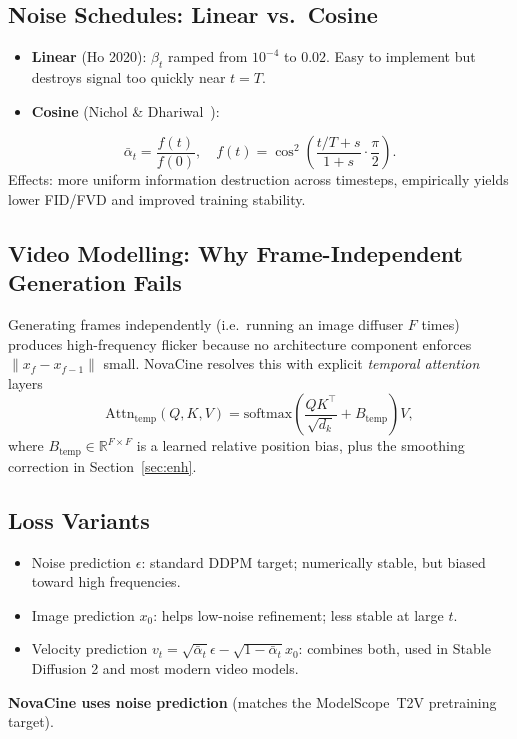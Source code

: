 \documentclass[conference]{IEEEtran}
\begin{document}
\subsection{Noise Schedules: Linear vs.\ Cosine}
\begin{itemize}
  \item \textbf{Linear} (Ho 2020): $\beta_t$ ramped from $10^{-4}$ to $0.02$.
        Easy to implement but destroys signal too quickly near $t=T$.
  \item \textbf{Cosine} (Nichol \& Dhariwal~\cite{improved_ddpm2021}):
\end{itemize}
\begin{equation}
\bar{\alpha}_t = \frac{f(t)}{f(0)},\quad
f(t) = \cos^2\!\left(\frac{t/T + s}{1+s}\cdot\frac{\pi}{2}\right).
\end{equation}
Effects: more uniform information destruction across timesteps,
empirically yields lower FID/FVD and improved training stability.

\subsection{Video Modelling: Why Frame-Independent Generation Fails}
Generating frames independently (i.e.\ running an image diffuser
$F$ times) produces high-frequency flicker because no architecture
component enforces $\|x_f - x_{f-1}\|$ small. NovaCine resolves
this with explicit \emph{temporal attention} layers
\begin{equation}
\mathrm{Attn}_{\text{temp}}(Q,K,V) = \mathrm{softmax}\!\left(\frac{QK^\top}{\sqrt{d_k}} + B_{\text{temp}}\right)V,
\end{equation}
where $B_{\text{temp}}\in\mathbb{R}^{F\times F}$ is a learned
relative position bias, plus the smoothing correction in
Section~\ref{sec:enh}.

\subsection{Loss Variants}
\begin{itemize}
  \item Noise prediction $\epsilon$: standard DDPM target; numerically stable, but biased toward high frequencies.
  \item Image prediction $x_0$: helps low-noise refinement; less stable at large $t$.
  \item Velocity prediction $v_t = \sqrt{\bar{\alpha}_t}\epsilon - \sqrt{1-\bar{\alpha}_t}x_0$: combines both, used in Stable Diffusion 2 and most modern video models.
\end{itemize}
\textbf{NovaCine uses noise prediction} (matches the
ModelScope~T2V pretraining target).
\end{document}
